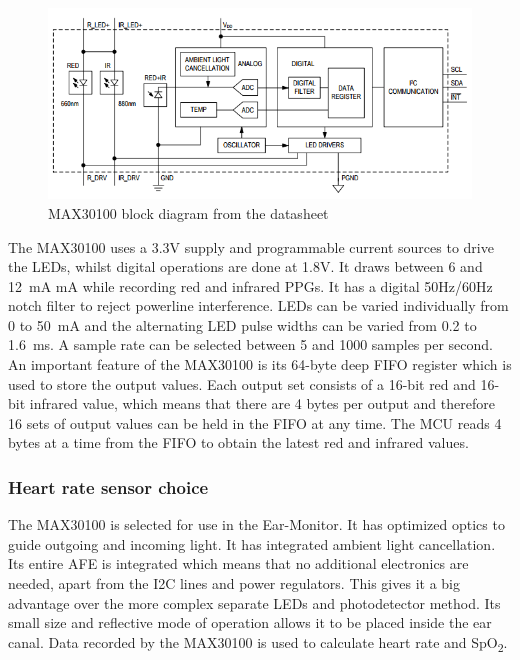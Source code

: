 \begin{figure}[H]
   \centering
   \includegraphics[scale=1]{figs/MAX30100_Diagram.png}
   \caption{MAX30100 block diagram from the datasheet}
   \label{fig:MAX30100_Diagram}
\end{figure}

The MAX30100 uses a 3.3V supply and programmable current sources to drive the LEDs, whilst digital operations are done at 1.8V. It draws between 6 and \SI{12}{\milli\ampere} mA while recording red and infrared PPGs. It has a digital 50Hz/60Hz notch filter to reject powerline interference. LEDs can be varied individually from 0 to \SI{50}{\milli\ampere} and the alternating LED pulse widths can be varied from 0.2 to \SI{1.6}{\milli\second}. A sample rate can be selected between 5 and 1000 samples per second. An important feature of the MAX30100 is its 64-byte deep FIFO register which is used to store the output values. Each output set consists of a 16-bit red and 16-bit infrared value, which means that there are 4 bytes per output and therefore 16 sets of output values can be held in the FIFO at any time. The MCU reads 4 bytes at a time from the FIFO to obtain the latest red and infrared values.

\subsubsection{Heart rate sensor choice}
The MAX30100 is selected for use in the Ear-Monitor. It has optimized optics to guide outgoing and incoming light. It has integrated ambient light cancellation. Its entire AFE is integrated which means that no additional electronics are needed, apart from the I2C lines and power regulators. This gives it a big advantage over the more complex separate LEDs and photodetector method. Its small size and reflective mode of operation allows it to be placed inside the ear canal. Data recorded by the MAX30100 is used to calculate heart rate and SpO\textsubscript{2}. 

